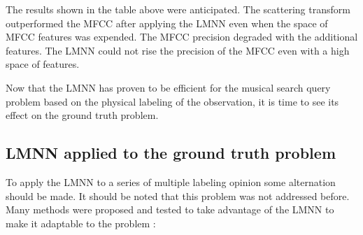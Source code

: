 \documentclass[hidelinks,12pt]{report}
\begin{document}
The results shown in the table above were anticipated. The scattering transform outperformed the MFCC after applying the LMNN even when the space of MFCC features was expended. The MFCC precision degraded with the additional features. The LMNN could not rise the precision of the MFCC even with a high space of features.\par 
Now that the LMNN has proven to be efficient for the musical search query problem based on the physical labeling of the observation, it is time to see its effect on the ground truth problem.
\subsection{LMNN applied to the ground truth problem}
To apply the LMNN to a series of multiple labeling opinion some alternation should be made. It should be noted that this problem was not addressed before. Many methods were proposed and tested to take advantage of the LMNN to make it adaptable to the problem : 
\end{document}
